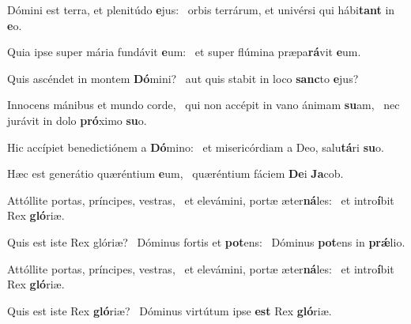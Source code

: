 \item Dómini est terra, et plenitúdo \textbf{e}jus:~\psstar{} orbis terrárum, et univérsi qui hábi\textbf{tant} in \textbf{e}o.
\item Quia ipse super mária fundávit \textbf{e}um:~\psstar{} et super flúmina præpa\textbf{rá}vit \textbf{e}um.
\item Quis ascéndet in montem \textbf{Dó}mini?~\psstar{} aut quis stabit in loco \textbf{sanc}to \textbf{e}jus?
\item Innocens mánibus et mundo corde,~\pscross{} qui non accépit in vano ánimam \textbf{su}am,~\psstar{} nec jurávit in dolo \textbf{pró}ximo \textbf{su}o.
\item Hic accípiet benedictiónem a \textbf{Dó}mino:~\psstar{} et misericórdiam a Deo, salu\textbf{tá}ri \textbf{su}o.
\item Hæc est generátio quæréntium \textbf{e}um,~\psstar{} quæréntium fáciem \textbf{De}i \textbf{Ja}cob.
\item Attóllite portas, príncipes, vestras,~\pscross{} et elevámini, portæ æter\textbf{ná}les:~\psstar{} et intro\textbf{í}bit Rex \textbf{gló}riæ.
\item Quis est iste Rex glóriæ?~\pscross{} Dóminus fortis et \textbf{pot}ens:~\psstar{} Dóminus \textbf{pot}ens in \textbf{prǽ}lio.
\item Attóllite portas, príncipes, vestras,~\pscross{} et elevámini, portæ æter\textbf{ná}les:~\psstar{} et intro\textbf{í}bit Rex \textbf{gló}riæ.
\item Quis est iste Rex \textbf{gló}riæ?~\psstar{} Dóminus virtútum ipse \textbf{est} Rex \textbf{gló}riæ.
